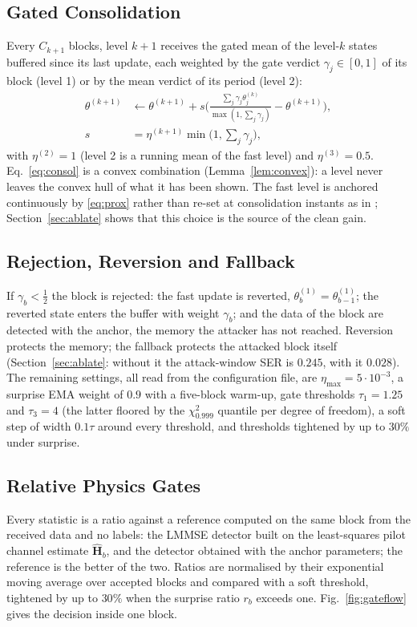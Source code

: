 \documentclass[journal]{IEEEtran}
\begin{document}
\subsection{Gated Consolidation}
Every $C_{k+1}$ blocks, level $k{+}1$ receives the gated mean of the level-$k$ states
buffered since its last update, each weighted by the gate verdict $\gamma_j\in[0,1]$ of
its block (level 1) or by the mean verdict of its period (level 2):
\begin{equation}\label{eq:consol}
\begin{aligned}
\theta^{(k+1)}&\leftarrow\theta^{(k+1)}+s\Big(\frac{\sum_j\gamma_j\theta^{(k)}_j}{\max(1,\sum_j\gamma_j)}-\theta^{(k+1)}\Big),\\
s&=\eta^{(k+1)}\min\big(1,\textstyle\sum_j\gamma_j\big),
\end{aligned}
\end{equation}
with $\eta^{(2)}=1$ (level 2 is a running mean of the fast level) and $\eta^{(3)}=0.5$.
Eq.~\eqref{eq:consol} is a convex combination (Lemma~\ref{lem:convex}): a level never
leaves the convex hull of what it has been shown. The fast level is anchored continuously
by \eqref{eq:prox} rather than re-set at consolidation instants as in
\cite{behrouz2025nested}; Section~\ref{sec:ablate} shows that this choice is the source
of the clean gain.

\subsection{Rejection, Reversion and Fallback}
If $\gamma_b<\tfrac12$ the block is rejected: the fast update is reverted,
$\theta^{(1)}_b=\theta^{(1)}_{b-1}$; the reverted state enters the buffer with weight
$\gamma_b$; and the data of the block are detected with the anchor, the memory the
attacker has not reached. Reversion protects the memory; the fallback protects the
attacked block itself (Section~\ref{sec:ablate}: without it the attack-window SER is
$0.245$, with it $0.028$). The remaining settings, all read from the configuration file,
are $\eta_{\max}=5\cdot10^{-3}$, a surprise EMA weight of $0.9$ with a five-block warm-up,
gate thresholds $\tau_1=1.25$ and $\tau_3=4$ (the latter floored by the $\chi^2_{0.999}$
quantile per degree of freedom), a soft step of width $0.1\tau$ around every threshold,
and thresholds tightened by up to $30\%$ under surprise.


\subsection{Relative Physics Gates}\label{sec:gates}
Every statistic is a ratio against a reference computed on the same block from the
received data and no labels: the LMMSE detector built on the least-squares pilot channel
estimate $\hat{\bm H}_b$, and the detector obtained with the anchor parameters; the
reference is the better of the two. Ratios are normalised by their exponential moving
average over accepted blocks and compared with a soft threshold, tightened by up to
$30\%$ when the surprise ratio $r_b$ exceeds one. Fig.~\ref{fig:gateflow} gives the
decision inside one block.
\end{document}
